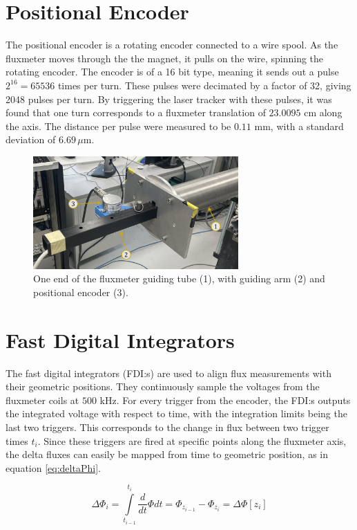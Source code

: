 \section{Positional Encoder}
The positional encoder is a rotating encoder connected to a wire spool.
As the fluxmeter moves through the the magnet, it pulls on the wire,
spinning the rotating encoder. The encoder is of a 16 bit type, meaning
it sends out a pulse $2^{16} = 65536$ times per turn. These pulses were
decimated by a factor of 32, giving 2048 pulses per turn. By triggering
the laser tracker with these pulses, it was found that one turn corresponds
to a fluxmeter translation of $23.0095$ cm along the axis. The distance
per pulse were measured to be $0.11$ mm, with a standard deviation of
$6.69 \, \mu \text{m}$.

\begin{figure}[h]
    \centering
    \includegraphics[width=0.7\textwidth]{figs/encoder}
    \caption{One end of the fluxmeter guiding tube (1), with guiding arm (2)
        and positional encoder (3).}
    \label{fig:encoderpic}
\end{figure}

\section{Fast Digital Integrators}
The fast digital integrators (FDI:s) are used to align flux measurements
with their geometric positions. They continuously sample the voltages
from the fluxmeter coils at $500$ kHz. For every trigger from the encoder,
the FDI:s outputs the integrated voltage with respect to time, with the
integration limits being the last two triggers. This
corresponds to the change in flux between two trigger times $t_i$. Since these
triggers are fired at specific points along the fluxmeter axis, the
delta fluxes can easily be mapped from time to geometric position, as in
equation \ref{eq:deltaPhi}.

\begin{equation}
    \Delta \Phi_i =
    \int \limits_{t_{i-1}}^{t_i} \frac{d}{dt}\Phi dt
    = \Phi_{z_{i-1}} - \Phi_{z_{i}} = \Delta \Phi[z_i]
    \label{eq:deltaPhi}
\end{equation}

